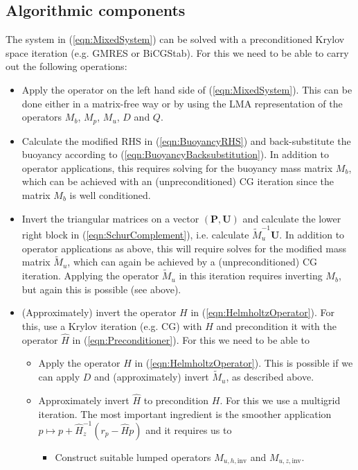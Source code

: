 \documentclass[10pt]{article}
\renewcommand{\vec}[1]{\boldsymbol{#1}}
\begin{document}
\subsection{Algorithmic components}
The system in (\ref{eqn:MixedSystem}) can be solved with a preconditioned Krylov space iteration (e.g. GMRES or BiCGStab). For this we need to be able to carry out the following operations:
\begin{itemize}
  \item Apply the operator on the left hand side of (\ref{eqn:MixedSystem}). This can be done either in a matrix-free way or by using the LMA representation of the operators $M_b$, $M_p$, $M_u$, $D$ and $Q$.
  \item Calculate the modified RHS in (\ref{eqn:BuoyancyRHS}) and back-substitute the buoyancy according to (\ref{eqn:BuoyancyBacksubstitution}). In addition to operator applications, this requires solving for the buoyancy mass matrix $M_b$, which can be achieved with an (unpreconditioned) CG iteration since the matrix $M_b$ is well conditioned.
  \item Invert the triangular matrices on a vector $(\vec{P},\vec{U})$ and calculate the lower right block in (\ref{eqn:SchurComplement}), i.e. calculate $\tilde{M}_u^{-1}\vec{U}$. In addition to operator applications as above, this will require solves for the modified mass matrix $\tilde{M}_u$, which can again be achieved by a (unpreconditioned) CG iteration. Applying the operator $\tilde{M}_u$ in this iteration requires inverting $M_b$, but again this is possible (see above).
  \item (Approximately) invert the operator $H$ in (\ref{eqn:HelmholtzOperator}). For this, use a Krylov iteration (e.g. CG) with $H$ and precondition it with the operator $\hat{H}$ in (\ref{eqn:Preconditioner}). For this we need to be able to
  \begin{itemize}
    \item Apply the operator $H$ in (\ref{eqn:HelmholtzOperator}). This is possible if we can apply $D$ and (approximately) invert $\tilde{M}_u$, as described above.
    \item Approximately invert $\hat{H}$ to precondition $H$. For this we use a multigrid iteration. The most important ingredient is the smoother application $p\mapsto p+\hat{H}_z^{-1}(r_p-\hat{H}p)$ and it requires us to
    \begin{itemize}
      \item Construct suitable lumped operators $M_{u,h,\text{inv}}$ and $M_{u,z,\text{inv}}$.

\end{itemize}
\end{itemize}
\end{itemize}
\end{document}
